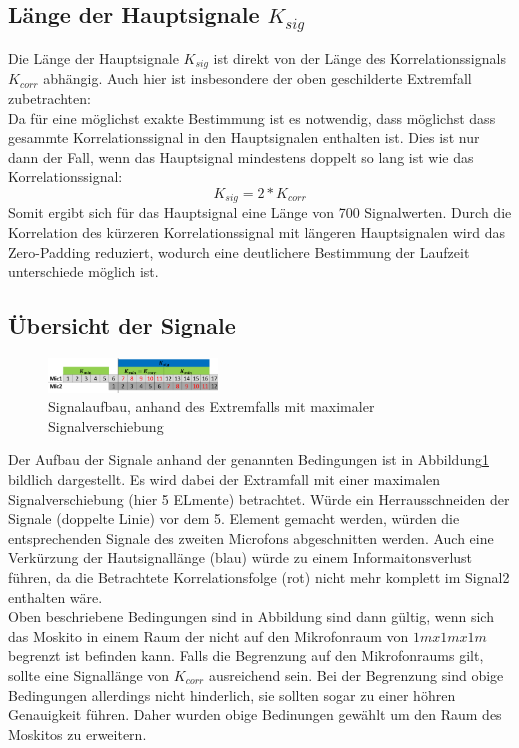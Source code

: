 \subsection{Länge der Hauptsignale $K_{sig}$}
Die Länge der Hauptsignale $K_{sig}$ ist direkt von der Länge des Korrelationssignals $K_{corr}$ abhängig. Auch hier ist insbesondere der oben geschilderte Extremfall zubetrachten:\\
Da für eine möglichst exakte Bestimmung ist es notwendig, dass möglichst dass gesammte Korrelationssignal in den Hauptsignalen enthalten ist. Dies ist nur dann der Fall, wenn das Hauptsignal mindestens doppelt so lang ist wie das Korrelationssignal:
\begin{equation}
K_{sig} =  2 * K_{corr}
\end{equation}
Somit ergibt sich für das Hauptsignal eine Länge von 700 Signalwerten.
Durch die Korrelation des kürzeren Korrelationssignal mit längeren Hauptsignalen wird das Zero-Padding reduziert, wodurch eine deutlichere Bestimmung der Laufzeit unterschiede möglich ist.
\subsection{Übersicht der Signale}


\begin{figure}
\centering 
\includegraphics[width=0.4\textwidth]{Korrelation2}
\caption{Signalaufbau, anhand des Extremfalls mit maximaler Signalverschiebung}\label{fig:Korrelation2}
\end{figure}

Der Aufbau der  Signale anhand der genannten Bedingungen ist in Abbildung\ref{fig:Korrelation2} bildlich dargestellt. 
Es wird dabei der Extramfall mit einer maximalen Signalverschiebung (hier 5 ELmente) betrachtet. Würde ein Herrausschneiden der Signale (doppelte Linie) vor dem 5. Element gemacht werden, würden die entsprechenden Signale des zweiten Microfons abgeschnitten werden. Auch eine Verkürzung der Hautsignallänge (blau) würde zu einem Informaitonsverlust führen, da die Betrachtete Korrelationsfolge (rot) nicht mehr komplett im Signal2 enthalten wäre.\\
Oben beschriebene Bedingungen sind in Abbildung sind dann gültig, wenn sich das Moskito in einem Raum der nicht auf den Mikrofonraum von $1m x 1m x 1m$ begrenzt ist befinden kann.
Falls die Begrenzung auf den Mikrofonraums gilt, sollte eine Signallänge von $K_{corr}$ ausreichend sein. Bei der Begrenzung sind obige Bedingungen allerdings nicht hinderlich, sie sollten sogar zu einer höhren Genauigkeit führen. Daher wurden obige Bedinungen gewählt um den Raum des Moskitos zu erweitern.


